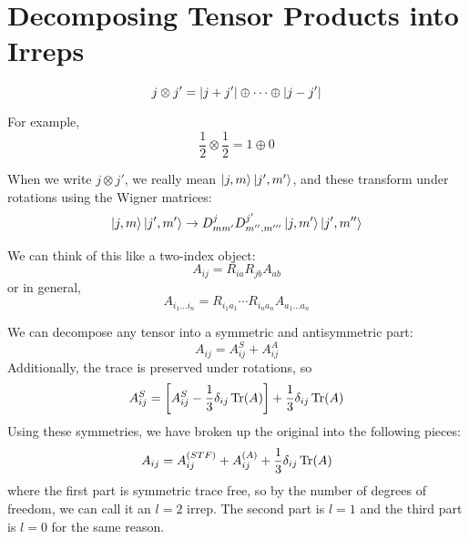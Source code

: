 \documentclass[12pt, twoside]{article}
\begin{document}
\section{Decomposing Tensor Products into Irreps}
\label{sec:decomposing_tensor_products_into_irreps}

\begin{equation}
    j \otimes j' = \abs{j+j'} \oplus \cdots \oplus \abs{j - j'}
\end{equation}

For example,
\begin{equation}
    \frac{1}{2} \otimes \frac{1}{2} = 1 \oplus 0
\end{equation}

When we write $ j \otimes j' $, we really mean $\ket{j,m}\ket{j',m'} $, and these transform under rotations using the Wigner matrices:
\begin{equation}
    \ket{j,m}\ket{j',m'} \to D^j_{mm'} D^{j'}_{m'',m'''}\ket{j,m'}\ket{j',m''}
\end{equation}

We can think of this like a two-index object:
\begin{equation}
    A_{ij} = R_{ia} R_{jb} A_{ab}
\end{equation}
or in general,
\begin{equation}
    A_{i_1 \ldots i_n} = R_{i_1 a_1} \cdots R_{i_n a_n} A_{a_1 \ldots a_n}
\end{equation}

We can decompose any tensor into a symmetric and antisymmetric part:
\begin{equation}
    A_{ij} = A_{ij}^S + A_{ij}^A
\end{equation}
Additionally, the trace is preserved under rotations, so
\begin{equation}
    A_{ij}^S = \left[A_{ij}^S - \frac{1}{3} \delta_{ij} \Tr(A)\right] + \frac{1}{3} \delta_{ij} \Tr(A)
\end{equation}
Using these symmetries, we have broken up the original into the following pieces:
\begin{equation}
    A_{ij} = A_{ij}^{(STF)} + A_{ij}^{(A)} + \frac{1}{3} \delta_{ij} \Tr(A)
\end{equation}
where the first part is symmetric trace free, so by the number of degrees of freedom, we can call it an $ l=2 $ irrep. The second part is $ l=1 $ and the third part is $ l=0 $ for the same reason.
\end{document}
